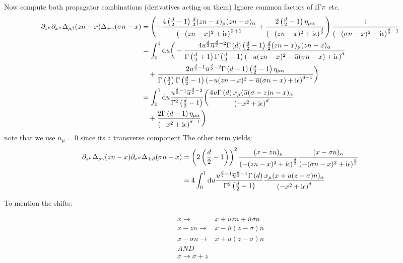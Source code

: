 Now compute both propagator combinations (derivatives acting on them)
Ignore common factors of $\text{i} \Gamma \pi$ etc.
\begin{align}
	\partial_{z^\mu} \partial_{x^\alpha} \Delta_{\rho \beta}(zn-x) \Delta_{+ \gamma}(\sigma n -x)
	&=
	\left(-\frac{4 \left(\frac{d}{2}-1\right)\frac{d}{2}(zn-x)_\mu (zn-x)_\alpha}{\left(-(zn-x)^2 +\text{i} \epsilon\right)^{\frac{d}{2}+1}} + \frac{2\left( \frac{d}{2}-1\right) \eta_{\mu \alpha} }{\left(-(zn-x)^2 +\text{i} \epsilon\right)^{\frac{d}{2}}}\right)\frac{1}{\left(-(\sigma n-x)^2 + \text{i} \epsilon\right)^{\frac{d}{2}-1}}
	\\
	&=
	\int_{0}^{1} \text{d} u 	\bigg(-\frac{4 u^{\frac{d}{2}} \overline u^{\frac{d}{2}-2} \Gamma\left( d \right) \left(\frac{d}{2}-1\right)\frac{d}{2}(zn-x)_\mu (zn-x)_\alpha}{\Gamma\left( \frac{d}{2} +1 \right) \Gamma\left( \frac{d}{2} -1 \right)\left(-u(zn-x)^2 - \overline u(\sigma n -x) +\text{i} \epsilon\right)^{d}} 
	\\&~~~
	+ \frac{2u^{\frac{d}{2}-1} \overline u ^{\frac{d}{2}-2}\Gamma\left( d-1 \right)\left( \frac{d}{2}-1\right) \eta_{\mu \alpha} }{\Gamma\left( \frac{d}{2}\right)\Gamma\left( \frac{d}{2} -1 \right)\left(-u(zn-x)^2 - \overline u(\sigma n -x) +\text{i} \epsilon\right)^{d-1}}\bigg)
	\\
	&=
	\int_{0}^{1} \text{d} u \frac{ u^{\frac{d}{2}-1} \overline u^{\frac{d}{2}-2} }{\Gamma^2\left( \frac{d}{2} -1 \right)}	\bigg(\frac{4 u \Gamma\left( d \right) x_\mu (\overline u(\sigma- z)n-x)_\alpha}{\left(-x^2 +\text{i} \epsilon\right)^{d}} 
	\\&~~~
	+ \frac{2\Gamma\left( d-1 \right) \eta_{\mu \alpha} }{\left(-x^2+\text{i} \epsilon\right)^{d-1}}\bigg)
\end{align}
note that we use $n_\mu=0$ since its a transverse component
The other term yields:
\begin{align}
	\partial_{z^\mu}  \Delta_{\rho \gamma}(zn-x) \partial_{x^\alpha}\Delta_{+ \beta}(\sigma n -x)
	&=
	\left(2 \left(\frac{d}{2}-1\right)\right)^2 \frac{(x-zn)_\mu}{\left(-(zn-x)^2+ \text{i} \epsilon\right)^{\frac{d}{2}}} \frac{(x-\sigma n)_\alpha}{\left(-(\sigma n-x)^2+ \text{i} \epsilon\right)^{\frac{d}{2}}}
	\\
	&=
	4\int_{0}^{1} \text{d} u \frac{u^{\frac{d}{2}-1} \overline u^{\frac{d}{2}-1}\Gamma\left( d \right)}{\Gamma^2\left( \frac{d}{2}-1 \right)}\frac{x_\mu(x +  u (z-\sigma) n)_\alpha}{\left(-x^2 + \text{i} \epsilon\right)^{d}}
\end{align}

To mention the shifts:

\begin{align}
	x\rightarrow& x + uzn + \overline u \sigma n
	\\
	x-zn \rightarrow & x - \overline u (z-\sigma)n
	\\
	x-\sigma n \rightarrow & x +  u (z-\sigma)n
	\\
	AND
	\\
	\sigma\rightarrow\sigma + z
\end{align}

